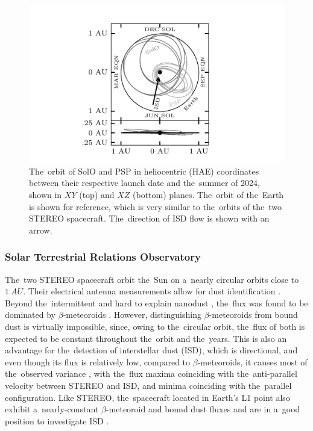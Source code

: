 \begin{figure}[hb]
 	\centering
 	\includegraphics[width=13cm]{figures/solo_orbit.pdf}
 	\caption{The~orbit of SolO and PSP in heliocentric (HAE) coordinates between their respective launch date and the~summer of 2024, shown in $XY$ (top) and $XZ$ (bottom) planes. The~orbit of the~Earth is shown for reference, which is very similar to the~orbits of the~two STEREO spacecraft. The~direction of ISD flow is shown with an arrow.}
 	\label{fig:sc_orbits}
\end{figure}

\subsubsection{Solar Terrestrial Relations Observatory}

The~two STEREO spacecraft orbit the~Sun on a~nearly circular orbits close to $\SI{1}{AU}$. Their electrical antenna measurements allow for dust identification \citep{meyer2009dust}. Beyond the~intermittent and hard to explain nanodust \citep{meyer2009dust}, the~flux was found to be dominated by $\beta$-meteoroids \citep{zaslavsky2012interplanetary}. However, distinguishing $\beta$-meteoroids from bound dust is virtually impossible, since, owing to the~circular orbit, the~flux of both is expected to be constant throughout the~orbit and the~years. This is also an advantage for the~detection of interstellar dust (ISD), which is directional, and even though its flux is relatively low, compared to $\beta$-meteoroids, it causes most of the~observed variance \citep{zaslavsky2012interplanetary,malaspina2015revisiting,babic2022situ}, with the~flux maxima coinciding with the~anti-parallel velocity between STEREO and ISD, and minima coinciding with the~parallel configuration. Like STEREO, the~spacecraft located in Earth's L1 point also exhibit a~nearly-constant $\beta$-meteoroid and bound dust fluxes and are in a~good position to investigate ISD \citep{malaspina2014interplanetary,malaspina2016database}.

